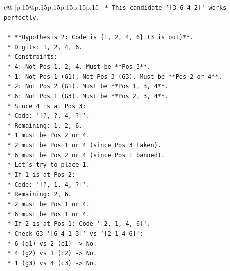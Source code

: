 \documentclass{article}
\begin{document}
{\begin{supertabular}{c@{$\;$}|p{.15\linewidth}@{}p{.15\linewidth}p{.15\linewidth}p{.15\linewidth}p{.15\linewidth}p{.15\linewidth}}
{{{\texttt{                *   This candidate `{[}3 6 4 2{]}` works perfectly.} \\
\\ 
\texttt{    *   **Hypothesis 2: Code is \{1, 2, 4, 6\} (3 is out)**.} \\
\texttt{        *   Digits: 1, 2, 4, 6.} \\
\texttt{        *   Constraints:} \\
\texttt{            *   4: Not Pos 1, 2, 4. Must be **Pos 3**.} \\
\texttt{            *   1: Not Pos 1 (G1), Not Pos 3 (G3). Must be **Pos 2 or 4**.} \\
\texttt{            *   2: Not Pos 2 (G1). Must be **Pos 1, 3, 4**.} \\
\texttt{            *   6: Not Pos 1 (G3). Must be **Pos 2, 3, 4**.} \\
\texttt{        *   Since 4 is at Pos 3:} \\
\texttt{            *   Code: `{[}?, ?, 4, ?{]}`.} \\
\texttt{            *   Remaining: 1, 2, 6.} \\
\texttt{            *   1 must be Pos 2 or 4.} \\
\texttt{            *   2 must be Pos 1 or 4 (since Pos 3 taken).} \\
\texttt{            *   6 must be Pos 2 or 4 (since Pos 1 banned).} \\
\texttt{            *   Let's try to place 1.} \\
\texttt{                *   If 1 is at Pos 2:} \\
\texttt{                    *   Code: `{[}?, 1, 4, ?{]}`.} \\
\texttt{                    *   Remaining: 2, 6.} \\
\texttt{                    *   2 must be Pos 1 or 4.} \\
\texttt{                    *   6 must be Pos 1 or 4.} \\
\texttt{                    *   If 2 is at Pos 1: Code `{[}2, 1, 4, 6{]}`.} \\
\texttt{                        *   Check G3 `{[}6 4 1 3{]}` vs `{[}2 1 4 6{]}`:} \\
\texttt{                            *   6 (g1) vs 2 (c1) {-}> No.} \\
\texttt{                            *   4 (g2) vs 1 (c2) {-}> No.} \\
\texttt{                            *   1 (g3) vs 4 (c3) {-}> No.} \\
}}}
\end{supertabular}}
\end{document}
